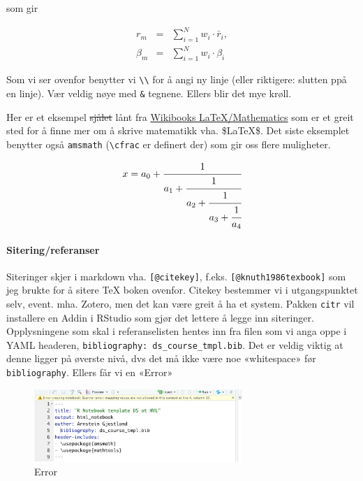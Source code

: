 \documentclass[
]{article}
\begin{document}
som gir

\begin{eqnarray}
r_m &=& \sum_{i=1}^N w_i \cdot \bar{r}_i, \\
\beta_m &=& \sum_{i=1}^N w_i \cdot \beta_i \nonumber
\end{eqnarray}

Som vi ser ovenfor benytter vi \texttt{\textbackslash{}\textbackslash{}}
for å angi ny linje (eller riktigere: slutten ppå en linje). Vær veldig
nøye med \texttt{\&} tegnene. Ellers blir det mye krøll.

Her er et eksempel \sout{sjålet} lånt fra
\href{https://en.wikibooks.org/wiki/LaTeX/Mathematics\#cite_note-amsmath-3}{Wikibooks
LaTeX/Mathematics} som er et greit sted for å finne mer om å skrive
matematikk vha. \$\LaTeX \$. Det siste eksemplet benytter også
\texttt{amsmath} (\texttt{\textbackslash{}cfrac} er definert der) som
gir oss flere muligheter.

\[
x = a_0 + \cfrac{1}{a_1 
          + \cfrac{1}{a_2 
          + \cfrac{1}{a_3 + \cfrac{1}{a_4} } } }
\]

\hypertarget{siteringreferanser}{%
\paragraph{Sitering/referanser}\label{siteringreferanser}}

Siteringer skjer i markdown vha. \texttt{{[}@citekey{]}}, f.eks.
\texttt{{[}@knuth1986texbook{]}} som jeg brukte for å sitere TeX boken
ovenfor. Citekey bestemmer vi i utgangspunktet selv, event. mha. Zotero,
men det kan være greit å ha et system. Pakken \texttt{citr} vil
installere en Addin i RStudio som gjør det lettere å legge inn
siteringer. Opplysningene som skal i referanselisten hentes inn fra
filen som vi anga oppe i YAML headeren,
\texttt{bibliography:\ ds\_course\_tmpl.bib}. Det er veldig viktig at
denne ligger på øverste nivå, dvs det må ikke være noe «whitespace» før
\texttt{bibliography}. Ellers får vi en «Error»

\begin{figure}
\centering
\includegraphics[width=0.7\textwidth,height=\textheight]{bib_error.png}
\caption{Error}
\end{figure}
\end{document}
